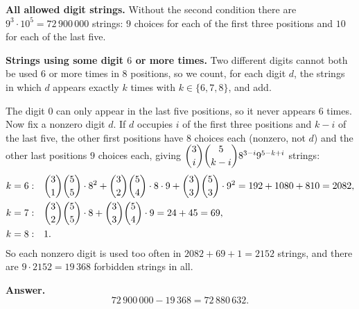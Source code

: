 \textbf{All allowed digit strings.} Without the second condition there are $9^3\cdot10^5=72\,900\,000$ strings: $9$ choices for each of the first three positions and $10$ for each of the last five.

\textbf{Strings using some digit $6$ or more times.} Two different digits cannot both be used $6$ or more times in $8$ positions, so we count, for each digit $d$, the strings in which $d$ appears exactly $k$ times with $k\in\{6,7,8\}$, and add.

The digit $0$ can only appear in the last five positions, so it never appears $6$ times. Now fix a nonzero digit $d$. If $d$ occupies $i$ of the first three positions and $k-i$ of the last five, the other first positions have $8$ choices each (nonzero, not $d$) and the other last positions $9$ choices each, giving $\dbinom3i\dbinom5{k-i}8^{3-i}9^{5-k+i}$ strings:
\[
\begin{aligned}
k=6:&\quad \dbinom31\dbinom55\cdot8^2+\dbinom32\dbinom54\cdot8\cdot9+\dbinom33\dbinom53\cdot9^2=192+1080+810=2082,\\
k=7:&\quad \dbinom32\dbinom55\cdot8+\dbinom33\dbinom54\cdot9=24+45=69,\\
k=8:&\quad 1 .
\end{aligned}
\]
So each nonzero digit is used too often in $2082+69+1=2152$ strings, and there are $9\cdot2152=19\,368$ forbidden strings in all.

\textbf{Answer.}
\[
72\,900\,000-19\,368=\boxed{72\,880\,632}.
\]
